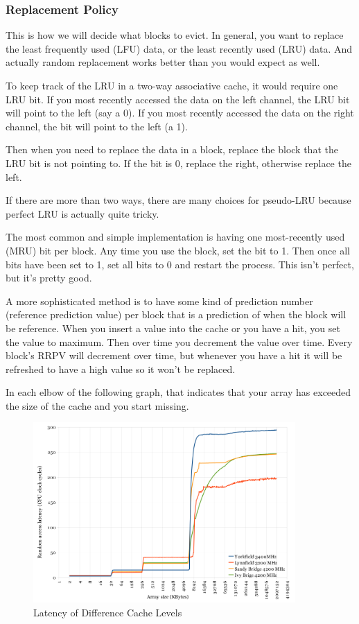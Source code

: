 \documentclass{article}
\begin{document}
\subsubsection{Replacement Policy}

This is how we will decide what blocks to evict. In general, you want to replace the least frequently used (LFU) data, or the least recently used (LRU) data. And actually random replacement works better than you would expect as well. 

To keep track of the LRU in a two-way associative cache, it would require one LRU bit. If you most recently accessed the data on the left channel, the LRU bit will point to the left (say a 0). If you most recently accessed the data on the right channel, the bit will point to the left (a 1). 

Then when you need to replace the data in a block, replace the block that the LRU bit is not pointing to. If the bit is 0, replace the right, otherwise replace the left.

If there are more than two ways, there are many choices for pseudo-LRU because perfect LRU is actually quite tricky. 

The most common and simple implementation is having one most-recently used (MRU) bit per block. Any time you use the block, set the bit to 1. Then once all bits have been set to 1, set all bits to 0 and restart the process. This isn't perfect, but it's pretty good.

A more sophisticated method is to have some kind of prediction number (reference prediction value) per block that is a prediction of when the block will be reference. When you insert a value into the cache or you have a hit, you set the value to maximum. Then over time you decrement the value over time. Every block's RRPV will decrement over time, but whenever you have a hit it will be refreshed to have a high value so it won't be replaced.

In each elbow of the following graph, that indicates that your array has exceeded the size of the cache and you start missing.

\begin{figure}[ht!]
\centering
\includegraphics[width=100mm]{img/hits.png}
\caption{Latency of Difference Cache Levels}
\end{figure}
\end{document}
